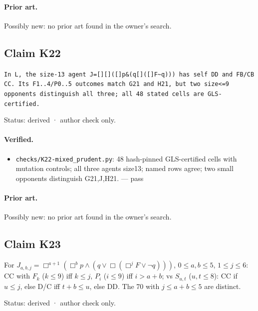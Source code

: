 \documentclass{article}
\begin{document}
\paragraph{Prior art.} Possibly new: no prior art found in the owner's search.

\subsection*{Claim K22}

\texttt{In L, the size-13 agent J=[][]([]p\&(q\textbar{}[]([]F\textbar{}\textasciitilde{}q))) has self DD and FB/CB CC. Its F1..4/P0..5 outcomes match G21 and H21, but two size\textless{}=9 opponents distinguish all three; all 48 stated cells are GLS-certified.}

Status: derived · author check only.

\paragraph{Verified.}
\begin{itemize}
\item \texttt{checks/K22-mixed\_prudent.py}: 48 hash-pinned GLS-certified cells with mutation controls; all three agents size13; named rows agree; two small opponents distinguish G21,J,H21. --- pass
\end{itemize}

\paragraph{Prior art.} Possibly new: no prior art found in the owner's search.

\subsection*{Claim K23}

For $J_{a,b,j}=\Box^{a+1}(\Box^b p\wedge(q\vee\Box(\Box^jF\vee\neg q)))$, $0\le a,b\le5$, $1\le j\le6$: CC with $F_k$ ($k\le9$) iff $k\le j$, $P_i$ ($i\le9$) iff $i>a+b$; vs $S_{u,t}$ ($u,t\le8$): CC if $u\le j$, else D/C iff $t+b\le u$, else DD. The 70 with $j\le a+b\le5$ are distinct.

Status: derived · author check only.
\end{document}
